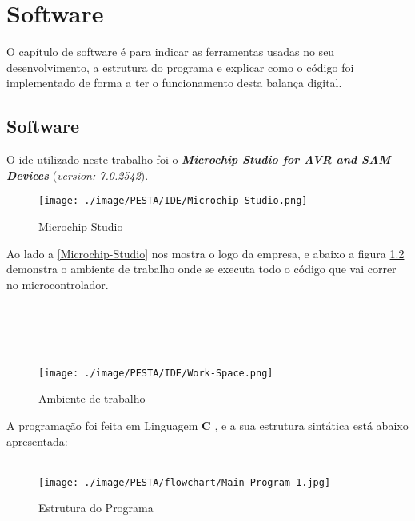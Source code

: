 \chapter{Software}
O capítulo de software é para indicar as ferramentas usadas no seu desenvolvimento, a estrutura do programa e explicar como o código foi implementado de forma a ter o funcionamento desta balança digital.
\section{Software}
O \ac{ide} utilizado neste trabalho foi o \textbf{\textit{{Microchip Studio for AVR\textsuperscript{\textregistered} and SAM Devices}}} (\textit{version: 7.0.2542}).
\\
\begin{minipage}[!b]{.55\linewidth}
	\begin{figure}[H]
		\captionsetup{justification=raggedright,singlelinecheck=false}
		\texttt{[image: ./image/PESTA/IDE/Microchip-Studio.png]}
		\caption{Microchip Studio}
		\label{Microchip-Studio}
	\end{figure}
\end{minipage}
\begin{minipage}[!b]{.45\linewidth}
	Ao lado a \autoref{Microchip-Studio} nos mostra o logo da empresa, e abaixo a figura \ref{Work-Space} demonstra o ambiente de trabalho onde se executa todo o código que vai correr no microcontrolador.
	\\
	\\
	\\
	\\
	\\
\end{minipage}
\begin{figure}[H]
	\centering
	\texttt{[image: ./image/PESTA/IDE/Work-Space.png]}
	\caption{Ambiente de trabalho}
	\label{Work-Space}
\end{figure}
A programação foi feita em Linguagem \textbf{C} \cite{book-11}, e a sua estrutura sintática está abaixo apresentada:
\\
\\
\begin{figure}[H]
	\centering
	\texttt{[image: ./image/PESTA/flowchart/Main-Program-1.jpg]}
	\caption{Estrutura do Programa}
	\label{Main_Program_1}
\end{figure}
